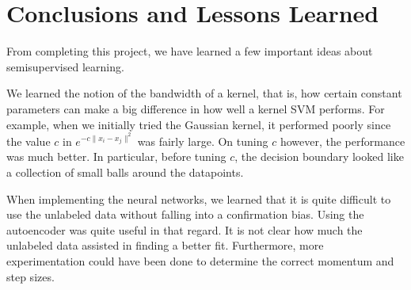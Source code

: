 \documentclass[11pt]{article}
\begin{document}
\section{Conclusions and Lessons Learned}

From completing this project, we have learned a few important ideas about semisupervised learning. 



We learned the notion of the bandwidth of a kernel, that is,
how certain constant parameters can make a big difference in how well
a kernel SVM performs. For example, when we initially tried the
Gaussian kernel, it performed poorly since the value
$c$ in $e^{-c\|x_i-x_j\|^2}$ was fairly large.
On tuning $c$ however, the performance was much better. In particular,
before tuning $c$, the decision boundary looked like a collection of
small balls around the datapoints.

When implementing the neural networks, we learned that it is quite difficult to use the unlabeled data without falling into a confirmation bias. Using the autoencoder was quite useful in that regard. It is not clear how much the unlabeled data assisted in finding a better fit. Furthermore, more experimentation could have been done to determine the correct momentum and step sizes.



\end{document}
